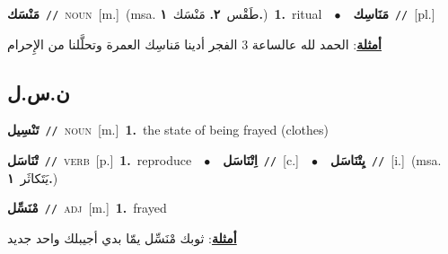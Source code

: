 \documentclass[10pt,a4paper,twoside]{article} %
\begin{document}
\begin{multicols}{2}
{\setlength\topsep{0pt}\textbf{\foreignlanguage{arabic}{مَنْسَك}}\ {\color{gray}\texttt{//}\color{black}}\ \textsc{noun}\ [m.]\ \color{gray}(msa. \foreignlanguage{arabic}{طَقْس}~\foreignlanguage{arabic}{\textbf{٢.}}  \foreignlanguage{arabic}{مَنْسَك}~\foreignlanguage{arabic}{\textbf{١.}})\color{black}\ \textbf{1.}~ritual\ \ $\bullet$\ \ \setlength\topsep{0pt}\textbf{\foreignlanguage{arabic}{مَنَاسِك}}\ {\color{gray}\texttt{//}\color{black}}\ [pl.]\  \begin{flushright}\color{gray}\foreignlanguage{arabic}{\textbf{\underline{\foreignlanguage{arabic}{أمثلة}}}: الحمد لله عالساعة 3 الفجر أدينا مَناسِك العمرة وتحلَّلنا من الإِحرام}\end{flushright}\color{black}} \vspace{2mm}

\vspace{-3mm}
\subsection*{\color{blue}\foreignlanguage{arabic}{ن.س.ل}\color{blue}{}} 

{\setlength\topsep{0pt}\textbf{\foreignlanguage{arabic}{تَنْسِيل}}\ {\color{gray}\texttt{//}\color{black}}\ \textsc{noun}\ [m.]\ \textbf{1.}~the state of being frayed (clothes)\ } \vspace{2mm}

{\setlength\topsep{0pt}\textbf{\foreignlanguage{arabic}{تْنَاسَل}}\ {\color{gray}\texttt{//}\color{black}}\ \textsc{verb}\ [p.]\ \textbf{1.}~reproduce\ \ $\bullet$\ \ \setlength\topsep{0pt}\textbf{\foreignlanguage{arabic}{اِتْنَاسَل}}\ {\color{gray}\texttt{//}\color{black}}\ [c.]\ \ $\bullet$\ \ \setlength\topsep{0pt}\textbf{\foreignlanguage{arabic}{يِتْنَاسَل}}\ {\color{gray}\texttt{//}\color{black}}\ [i.]\ \color{gray}(msa. \foreignlanguage{arabic}{يَتَكاثَر}~\foreignlanguage{arabic}{\textbf{١.}})\color{black}\ } \vspace{2mm}

{\setlength\topsep{0pt}\textbf{\foreignlanguage{arabic}{مْنَسِّل}}\ {\color{gray}\texttt{//}\color{black}}\ \textsc{adj}\ [m.]\ \textbf{1.}~frayed\  \begin{flushright}\color{gray}\foreignlanguage{arabic}{\textbf{\underline{\foreignlanguage{arabic}{أمثلة}}}: ثوبك مْنَسِّل يمّا بدي أجيبلك واحد جديد}\end{flushright}\color{black}} \vspace{2mm}


\end{multicols}
\end{document}
